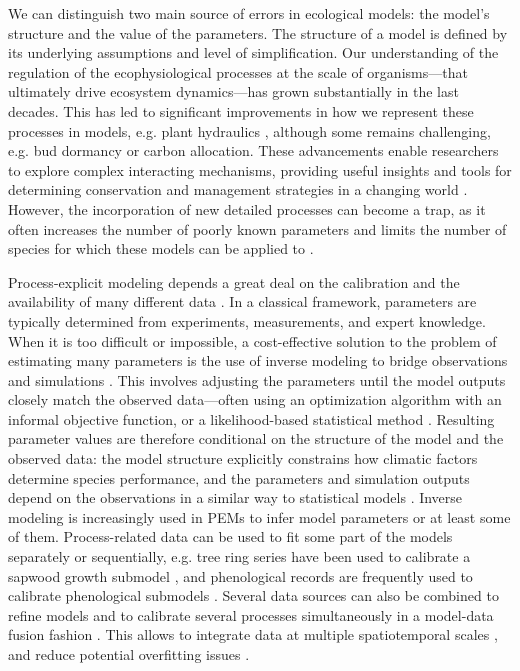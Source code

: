 \documentclass[preprint,12pt,authoryear]{elsarticle}
\begin{document}
We can distinguish two main source of errors in ecological models: the model's structure and the value of the parameters. The structure of a model is defined by its underlying assumptions and level of simplification. Our understanding of the regulation of the ecophysiological processes at the scale of organisms---that ultimately drive  ecosystem dynamics---has grown substantially in the last decades. This has led to significant improvements in how we represent these processes in models, e.g. plant hydraulics \citep{Ruffault2022}, although some remains challenging, e.g. bud dormancy \citep{Chuine2016} or carbon allocation. 
These advancements enable researchers to explore complex interacting mechanisms, providing useful insights and tools for determining conservation and management strategies in a changing world \citep{Urban2016}. However, the incorporation of new detailed processes can become a trap, as it often increases the number of poorly known parameters and limits the number of species for which these models can be applied to \citep{Franklin2020}. %

Process-explicit modeling depends a great deal on the calibration and the availability of \textcolor{customred}{many different data} \citep{Cabral2017}. In a classical framework, parameters are typically determined from experiments, measurements, and expert knowledge. When it is too difficult or impossible, a cost-effective solution to the problem of estimating many parameters is the use of inverse modeling to bridge observations and simulations \citep{Evans2016}. This involves adjusting the parameters until the model outputs closely match the observed data---often using an optimization algorithm with an informal objective function, or a likelihood-based statistical method \citep{Malchow2024}. Resulting parameter values are therefore conditional on the structure of the model  and the observed data: the model structure explicitly constrains how climatic factors determine species performance, and the parameters and simulation outputs depend on the observations in a similar way to statistical models \citep{Zhang2024}. Inverse modeling is increasingly used in PEMs to infer model parameters or at least some of them. Process-related data can be used to fit some part of the models separately or sequentially, e.g. tree ring series have been used to calibrate a sapwood growth submodel \citep{DeCaceres2023}, and phenological records are frequently used to calibrate phenological submodels \citep{Chuine2013}. Several data sources can also be combined to refine models \citep{Pagel2011, BenitoGarzon2019} and to calibrate several processes simultaneously in a model-data fusion fashion \citep[e.g.][]{Trotsiuk2020}. This allows to integrate data at multiple spatiotemporal scales \citep{Hartig2012, Niu2014}, and reduce potential overfitting issues \citep{Bacour2023}.
\end{document}

